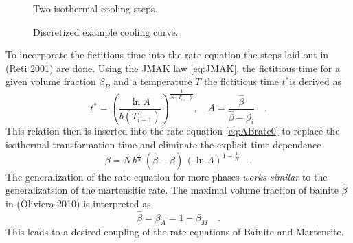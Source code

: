 \begin{figure}[h]
\centering
{} %
\caption{Two isothermal cooling steps.}
\label{fig:ficTime}
\end{figure}

\begin{figure}[h]
\centering
{} 
\caption{Discretized example cooling curve.}
\label{fig:discTt}
\end{figure}

\begin{figure}[h]
\centering
{} %
\caption{}
\label{fig:}
\end{figure}




To incorporate the fictitious time into the rate equation the steps laid out in (Reti 2001) are done. Using the JMAK law \ref{eq:JMAK}, the fictitious time for a given volume fraction $\beta_B$ and a temperature $T$ the fictitious time $t^\ast $is derived as 
\begin{equation}
	t^\ast = \left( \frac{\ln A}{b(T_{i+1})}\right)^\frac{1}{N(T_{i+1})}, \quad A = \frac{\hat{\beta}}{\hat{\beta}-\beta_i}  \quad.
\end{equation}
This relation then is inserted into the rate equation \ref{eq:ABrate0} to replace the isothermal transformation time and eliminate the explicit time dependence 
\begin{equation}
	\dot{\beta} = N\,b^{\frac{1}{N}}\,(\hat{\beta}-\beta)\,\left(\ln A \right)^{1-\frac{1}{N}}\quad. \label{eq:ABrate}
\end{equation}
The generalization of the rate equation for more phases \textit{works similar} to the generalizatsion of the martensitic rate. The maximal volume fraction of bainite $\hat{\beta}$ in (Oliviera 2010) is interpreted as 
\begin{equation}
	\hat{\beta} = \beta_A = 1 - \beta_M \quad. 
\end{equation}
This leads to a desired coupling of the rate equations of Bainite and Martensite. \\\\





